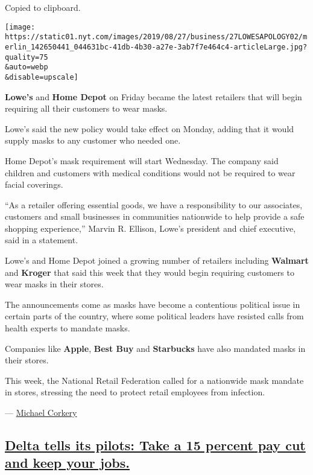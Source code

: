 Copied to clipboard.

\texttt{[image: https://static01.nyt.com/images/2019/08/27/business/27LOWESAPOLOGY02/merlin\_142650441\_044631bc-41db-4b30-a27e-3ab7f7e464c4-articleLarge.jpg?quality=75\\\&auto=webp\\\&disable=upscale]}

\textbf{Lowe's} and \textbf{Home Depot} on Friday became the latest
retailers that will begin requiring all their customers to wear masks.

Lowe's said the new policy would take effect on Monday, adding that it
would supply masks to any customer who needed one.

Home Depot's mask requirement will start Wednesday. The company said
children and customers with medical conditions would not be required to
wear facial coverings.

``As a retailer offering essential goods, we have a responsibility to
our associates, customers and small businesses in communities nationwide
to help provide a safe shopping experience,'' Marvin R. Ellison, Lowe's
president and chief executive, said in a statement.

Lowe's and Home Depot joined a growing number of retailers including
\textbf{Walmart} and \textbf{Kroger} that said this week that they would
begin requiring customers to wear masks in their stores.

The announcements come as masks have become a contentious political
issue in certain parts of the country, where some political leaders have
resisted calls from health experts to mandate masks.

Companies like \textbf{Apple}, \textbf{Best Buy} and \textbf{Starbucks}
have also mandated masks in their stores.

This week, the National Retail Federation called for a nationwide mask
mandate in stores, stressing the need to protect retail employees from
infection.

--- \href{https://www.nytimes.com/by/michael-corkery}{Michael Corkery}

\hypertarget{delta-tells-its-pilots-take-a-15-percent-pay-cut-and-keep-your-jobs}{%
\subsection{\texorpdfstring{\protect\hyperlink{delta-tells-its-pilots-take-a-15-percent-pay-cut-and-keep-your-jobs.html}{Delta
tells its pilots: Take a 15 percent pay cut and keep your
jobs.}}{Delta tells its pilots: Take a 15 percent pay cut and keep your jobs.}}\label{delta-tells-its-pilots-take-a-15-percent-pay-cut-and-keep-your-jobs}}

